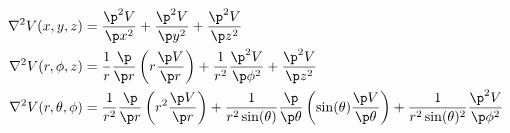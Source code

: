 \begin{align*}
	\nabla^2 V(x,y,z) &= \frac{\p^2 V}{\p x^2} + \frac{\p^2 V}{\p y^2} + \frac{\p^2 V}{\p z^2} \\
%
	\nabla^2 V(r,\phi,z) &=%
		\frac{1}{r} \frac{\p}{\p r} \left( r \frac{\p V}{\p r} \right) +%
		\frac{1}{r^2} \frac{\p^2 V}{\p \phi^2} +%
		\frac{\p^2 V}{\p z^2} \\
%
	\nabla^2 V(r,\theta,\phi) &=%
		\frac{1}{r^2} \frac{\p}{\p r} \left( r^2 \frac{\p V}{\p r} \right) +%
		\frac{1}{r^2 \sin(\theta)} \frac{\p}{\p \theta} \left( \sin(\theta)\frac{\p V}{\p \theta} \right) +%
		\frac{1}{r^2 \sin(\theta)^2} \frac{\p^2 V}{\p \phi^2}
\end{align*}
